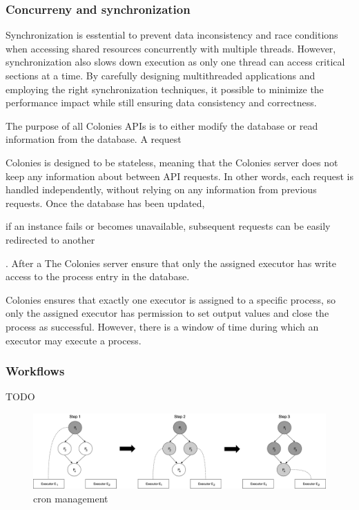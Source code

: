 \documentclass{article}
\begin{document}
\subsubsection{Concurreny and synchronization}
Synchronization is esstential to prevent data inconsistency and race conditions when accessing shared resources concurrently with multiple threads. However, synchronization also slows down execution as only one thread can access critical sections at a time. By carefully designing multithreaded applications and employing the right synchronization techniques, it possible to minimize the performance impact while still ensuring data consistency and correctness.  

The purpose of all Colonies APIs is to either modify the database or read information from the database. A request 

Colonies is designed to be stateless, meaning that the Colonies server does not keep any information about between API requests. In other words, each request is handled independently, without relying on any information from previous requests. Once the database has been updated,

if an instance fails or becomes unavailable, subsequent requests can be easily redirected to another

. After a The Colonies server ensure that only the assigned executor has write access to the process entry in the database. 

Colonies ensures that exactly one executor is assigned to a specific process, so only the assigned executor has permission to set output values and close the process as successful. However, there is a window of time during which an executor may execute a process.

\subsubsection{Workflows}
TODO
\begin{figure}[h]
	\centering
    \includegraphics[scale=0.32]{workflow.png}
	\caption{cron management}
	\label{fig:fig3}
\end{figure}
\end{document}
